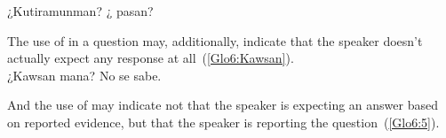 %
{¿Kutiramunman? ¿ pasan?}%
{}%
{}{}%

\noindent
The use of  in a question may, additionally, indicate that the speaker doesn’t actually expect any response at all~(\ref{Glo6:Kawsan}).\\

%
{¿Kawsan mana? No se sabe.}%
{}%
{}{}%

\noindent
And the use of  may indicate not that the speaker is expecting an answer based on reported evidence, but that the speaker is reporting the question~(\ref{Glo6:5}).
